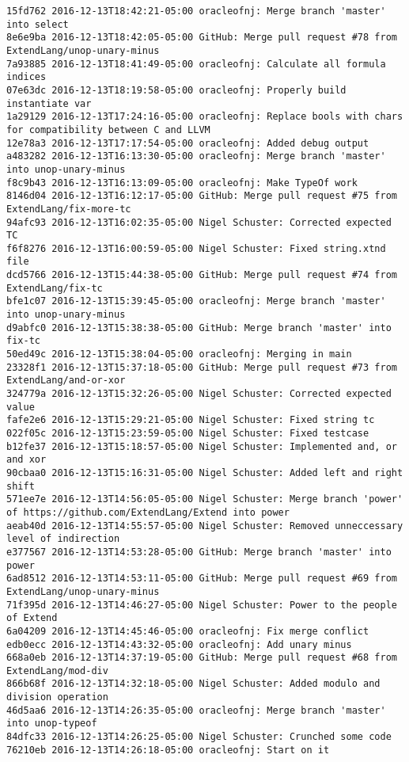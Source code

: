 \begin{lstlisting}
15fd762 2016-12-13T18:42:21-05:00 oracleofnj: Merge branch 'master' into select
8e6e9ba 2016-12-13T18:42:05-05:00 GitHub: Merge pull request #78 from ExtendLang/unop-unary-minus
7a93885 2016-12-13T18:41:49-05:00 oracleofnj: Calculate all formula indices
07e63dc 2016-12-13T18:19:58-05:00 oracleofnj: Properly build instantiate var
1a29129 2016-12-13T17:24:16-05:00 oracleofnj: Replace bools with chars for compatibility between C and LLVM
12e78a3 2016-12-13T17:17:54-05:00 oracleofnj: Added debug output
a483282 2016-12-13T16:13:30-05:00 oracleofnj: Merge branch 'master' into unop-unary-minus
f8c9b43 2016-12-13T16:13:09-05:00 oracleofnj: Make TypeOf work
8146d04 2016-12-13T16:12:17-05:00 GitHub: Merge pull request #75 from ExtendLang/fix-more-tc
94afc93 2016-12-13T16:02:35-05:00 Nigel Schuster: Corrected expected TC
f6f8276 2016-12-13T16:00:59-05:00 Nigel Schuster: Fixed string.xtnd file
dcd5766 2016-12-13T15:44:38-05:00 GitHub: Merge pull request #74 from ExtendLang/fix-tc
bfe1c07 2016-12-13T15:39:45-05:00 oracleofnj: Merge branch 'master' into unop-unary-minus
d9abfc0 2016-12-13T15:38:38-05:00 GitHub: Merge branch 'master' into fix-tc
50ed49c 2016-12-13T15:38:04-05:00 oracleofnj: Merging in main
23328f1 2016-12-13T15:37:18-05:00 GitHub: Merge pull request #73 from ExtendLang/and-or-xor
324779a 2016-12-13T15:32:26-05:00 Nigel Schuster: Corrected expected value
fafe2e6 2016-12-13T15:29:21-05:00 Nigel Schuster: Fixed string tc
022f05c 2016-12-13T15:23:59-05:00 Nigel Schuster: Fixed testcase
b12fe37 2016-12-13T15:18:57-05:00 Nigel Schuster: Implemented and, or and xor
90cbaa0 2016-12-13T15:16:31-05:00 Nigel Schuster: Added left and right shift
571ee7e 2016-12-13T14:56:05-05:00 Nigel Schuster: Merge branch 'power' of https://github.com/ExtendLang/Extend into power
aeab40d 2016-12-13T14:55:57-05:00 Nigel Schuster: Removed unneccessary level of indirection
e377567 2016-12-13T14:53:28-05:00 GitHub: Merge branch 'master' into power
6ad8512 2016-12-13T14:53:11-05:00 GitHub: Merge pull request #69 from ExtendLang/unop-unary-minus
71f395d 2016-12-13T14:46:27-05:00 Nigel Schuster: Power to the people of Extend
6a04209 2016-12-13T14:45:46-05:00 oracleofnj: Fix merge conflict
edb0ecc 2016-12-13T14:43:32-05:00 oracleofnj: Add unary minus
668a0eb 2016-12-13T14:37:19-05:00 GitHub: Merge pull request #68 from ExtendLang/mod-div
866b68f 2016-12-13T14:32:18-05:00 Nigel Schuster: Added modulo and division operation
46d5aa6 2016-12-13T14:26:35-05:00 oracleofnj: Merge branch 'master' into unop-typeof
84dfc33 2016-12-13T14:26:25-05:00 Nigel Schuster: Crunched some code
76210eb 2016-12-13T14:26:18-05:00 oracleofnj: Start on it

\end{lstlisting}
